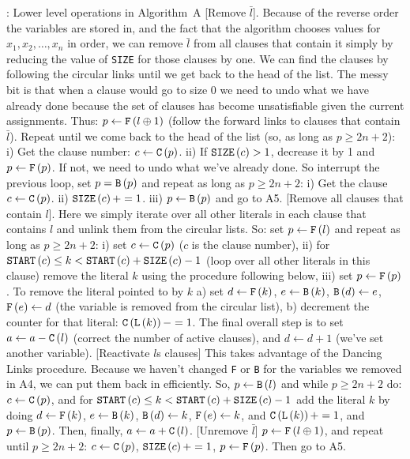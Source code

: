 : Lower level operations in Algorithm~A
 [Remove $\bar l$].  Because of the reverse order the variables are
stored in, and the fact that the algorithm chooses values for $x_1, x_2, \ldots, x_n$
in order, we can remove $\bar l$ from all clauses that contain it simply by
reducing the value of {\tt SIZE} for those clauses by one.  We can find the clauses
by following the circular links until we get back to the head of the list.
The messy bit is that when a clause would go to size 0 we need to undo
what we have already done because the set of clauses has become unsatisfiable
given the current assignments.  Thus: $p \gets {\tt F}\left(l \oplus 1\right)$ 
(follow the forward links to clauses that contain $\bar l$).  Repeat until
we come back to the head of the list (so, as long as $p \ge 2 n + 2$):
i) Get the clause number: $c \gets {\tt C}\left(p\right)$. ii) If ${\tt SIZE}\left(c\right) > 1$,
 decrease it by 1 and $p \gets {\tt F}\left(p\right)$.  If not, we need to undo what
 we've already done.  So interrupt the previous
 loop, set $p = {\tt B}\left(p\right)$ and repeat as long as $p \ge 2 n + 2$:
 i) Get the clause $c \gets {\tt C}\left(p\right)$. ii) ${\tt SIZE}\left(c\right) += 1$.
 iii) $p \gets {\tt B}\left(p\right)$ and go to A5.
 [Remove all clauses that contain $l$].  Here we simply iterate
over all other literals in each clause that contains $l$ and unlink them from
the circular lists.  So: set $p \gets {\tt F}\left(l\right)$ and repeat as
long as $p \ge 2 n + 2$: i) set $c \gets {\tt C}\left(p\right)$ ($c$ is
the clause number), ii) for ${\tt START}\left(c\right) \le k < {\tt START}\left(c\right)
 + {\tt SIZE}\left(c\right) - 1$ (loop over all other literals in this clause)
 remove the literal $k$ using the procedure following below, iii) set $p \gets {\tt F}\left(p\right)$.
 To remove the literal pointed to by $k$ a) set $d \gets {\tt F}\left(k\right)$,
 $e \gets {\tt B}\left(k\right)$, ${\tt B}\left(d\right) \gets e$, ${\tt F}\left(e\right) \gets d$
 (the variable is removed from the circular list), b) decrement the counter for that
 literal: ${\tt C}\left({\tt L}\left(k\right)\right) -= 1$. The final overall step is
 to set $a \gets a - {\tt C}\left(l\right)$ (correct the number of active clauses),
 and $d \gets d + 1$ (we've set another variable).
 [Reactivate $l$s clauses] This takes advantage of the 
 Dancing Links procedure.  Because we haven't changed {\tt F} or {\tt B} for the variables
 we removed in A4, we can put them back in efficiently.  So, $p \gets {\tt B}\left(l\right)$
 and while $p \ge 2 n + 2$ do: $c \gets {\tt C}\left(p\right)$, and for
 ${\tt START}\left(c\right) \le k < {\tt START}\left(c\right) + {\tt SIZE}\left(c\right) - 1$
add the literal $k$ by doing $d \gets {\tt F}\left(k\right)$, $e \gets {\tt B}\left(k\right)$,
${\tt B}\left(d\right) \gets k$, ${\tt F}\left(e\right) \gets k$, and 
${\tt C}\left({\tt L}\left(k\right)\right) += 1$, and $p \gets {\tt B}\left(p\right)$.
Then, finally, $a \gets a + {\tt C}\left(l\right)$.
 [Unremove $\bar l$] $p \gets {\tt F}\left(l \oplus 1\right)$,
and repeat until $p \ge 2 n + 2$: $c \gets {\tt C}\left(p\right)$,
${\tt SIZE}\left(c\right) += 1$, $p \gets {\tt F}\left(p\right)$.  Then go to A5.

